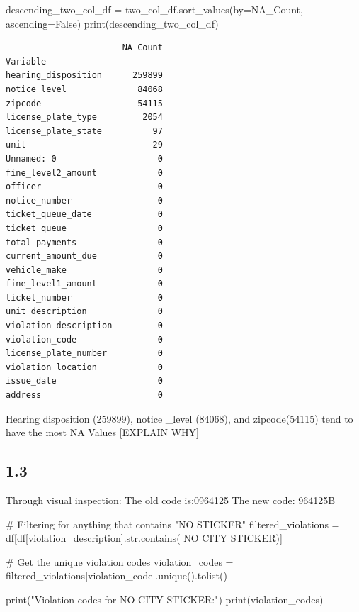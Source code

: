 \documentclass[
  letterpaper,
  DIV=11,
  numbers=noendperiod]{scrartcl}
\newenvironment{Shaded}{\begin{snugshade}}{\end{snugshade}}
\newcommand{\BuiltInTok}[1]{\textcolor[rgb]{0.00,0.23,0.31}{#1}}
\newcommand{\CommentTok}[1]{\textcolor[rgb]{0.37,0.37,0.37}{#1}}
\newcommand{\NormalTok}[1]{\textcolor[rgb]{0.00,0.23,0.31}{#1}}
\newcommand{\OperatorTok}[1]{\textcolor[rgb]{0.37,0.37,0.37}{#1}}
\newcommand{\StringTok}[1]{\textcolor[rgb]{0.13,0.47,0.30}{#1}}
\newcommand{\VariableTok}[1]{\textcolor[rgb]{0.07,0.07,0.07}{#1}}
\begin{document}
\begin{Shaded}
\begin{Highlighting}[]
\NormalTok{descending\_two\_col\_df }\OperatorTok{=}\NormalTok{ two\_col\_df.sort\_values(by}\OperatorTok{=}\StringTok{\textquotesingle{}NA\_Count\textquotesingle{}}\NormalTok{, ascending}\OperatorTok{=}\VariableTok{False}\NormalTok{)}
\BuiltInTok{print}\NormalTok{(descending\_two\_col\_df)}
\end{Highlighting}
\end{Shaded}

\begin{verbatim}
                       NA_Count
Variable                       
hearing_disposition      259899
notice_level              84068
zipcode                   54115
license_plate_type         2054
license_plate_state          97
unit                         29
Unnamed: 0                    0
fine_level2_amount            0
officer                       0
notice_number                 0
ticket_queue_date             0
ticket_queue                  0
total_payments                0
current_amount_due            0
vehicle_make                  0
fine_level1_amount            0
ticket_number                 0
unit_description              0
violation_description         0
violation_code                0
license_plate_number          0
violation_location            0
issue_date                    0
address                       0
\end{verbatim}

Hearing disposition (259899), notice \_level (84068), and zipcode(54115)
tend to have the most NA Values {[}EXPLAIN WHY{]}

\subsection{1.3}\label{section-1}

Through visual inspection: The old code is:0964125 The new code: 964125B

\begin{Shaded}
\begin{Highlighting}[]
\CommentTok{\# Filtering for anything that contains "NO STICKER"}
\NormalTok{filtered\_violations }\OperatorTok{=}\NormalTok{ df[df[}\StringTok{\textquotesingle{}violation\_description\textquotesingle{}}\NormalTok{].}\BuiltInTok{str}\NormalTok{.contains(}
    \StringTok{\textquotesingle{}NO CITY STICKER\textquotesingle{}}\NormalTok{)]}

\CommentTok{\# Get the unique violation codes}
\NormalTok{violation\_codes }\OperatorTok{=}\NormalTok{ filtered\_violations[}\StringTok{\textquotesingle{}violation\_code\textquotesingle{}}\NormalTok{].unique().tolist()}

\BuiltInTok{print}\NormalTok{(}\StringTok{"Violation codes for \textquotesingle{}NO CITY STICKER\textquotesingle{}:"}\NormalTok{)}
\BuiltInTok{print}\NormalTok{(violation\_codes)}
\end{Highlighting}
\end{Shaded}
\end{document}
